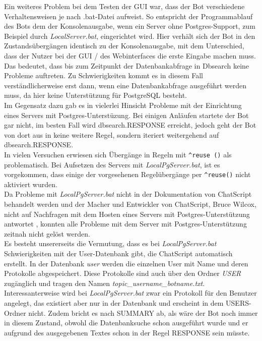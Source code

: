 Ein weiteres Problem bei dem Testen der GUI war, dass der Bot verschiedene Verhaltensweisen je nach .bat-Datei aufweist. So entspricht der Programmablauf des Bots dem der Konsolenausgabe, wenn ein Server ohne Postgres-Support, zum Beispiel durch \textit{LocalServer.bat}, eingerichtet wird. Hier verhält sich der Bot in den Zustandsübergängen identisch zu der Konsolenausgabe, mit dem Unterschied, dass der Nutzer  bei der GUI / des Webinterfaces die erste Eingabe machen muss.\\
Das bedeutet, dass bis zum Zeitpunkt der Datenbankabfrage in Dbsearch keine Probleme auftreten. Zu Schwierigkeiten kommt es in diesem Fall verständlicherweise erst dann, wenn eine Datenbankabfrage ausgeführt werden muss, da hier keine Unterstützung für PostgreSQL besteht.\\
Im Gegensatz dazu gab es in vielerlei Hinsicht Probleme mit der Einrichtung eines Servers mit Postgres-Unterstüzung. Bei einigen Anläufen startete der Bot gar nicht, im besten Fall wird \texttildelow dbsearch.RESPONSE erreicht, jedoch geht der Bot von dort aus in keine weitere Regel, sondern iteriert weitergehend auf \texttildelow dbsearch.RESPONSE.\\
In vielen Versuchen erwiesen sich Übergänge in Regeln mit \lstinline|^reuse ()| als problematisch. Bei Aufsetzen des Servers mit \textit{LocalPgServer.bat}, ist es vorgekommen, dass einige der vorgesehenen Regelübergänge per \lstinline|^reuse()| nicht aktiviert wurden. \\
Da Probleme mit \textit{LocalPgServer.bat} nicht in der Dokumentation von ChatScript behandelt werden und der Macher und Entwickler von ChatScript, Bruce Wilcox, nicht auf Nachfragen mit dem Hosten eines Servers mit Postgres-Unterstützung antwortet \cite{cb5}, konnten alle Probleme mit dem Server mit Postgres-Unterstützung zeitnah nicht gelöst werden.\\
Es besteht unsererseits die Vermutung, dass es bei \textit{LocalPgServer.bat} Schwierigkeiten mit der User-Datenbank gibt, die ChatScript automatisch erstellt. In der Datenbank \textit{user} werden die einzelnen User mit Name und deren Protokolle abgespeichert. Diese Protokolle sind auch über den Ordner \textit{USER} zugänglich und tragen den Namen \textit{topic\_username\_botname.txt}. Interessanterweise wird bei \textit{LocalPgServer.bat} zwar ein Protokoll für den Benutzer angelegt, das existiert aber nur in der Datenbank und erscheint in dem USERS-Ordner nicht. Zudem bricht es nach SUMMARY ab, als wäre der Bot noch immer in diesem Zustand, obwohl die Datenbanksuche schon ausgeführt wurde und er aufgrund des ausgegebenen Textes schon in der Regel RESPONSE sein müsste.\\

